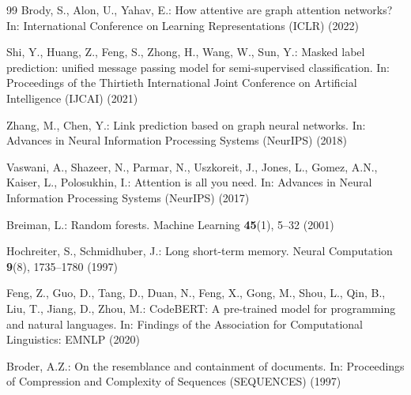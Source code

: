 \documentclass[pdflatex,sn-mathphys-num]{sn-jnl}
\begin{document}
\begin{thebibliography}{99}
Brody, S., Alon, U., Yahav, E.: How attentive are graph attention networks?
In: International Conference on Learning Representations (ICLR) (2022)

Shi, Y., Huang, Z., Feng, S., Zhong, H., Wang, W., Sun, Y.: Masked label
prediction: unified message passing model for semi-supervised classification.
In: Proceedings of the Thirtieth International Joint Conference on Artificial
Intelligence (IJCAI) (2021)

Zhang, M., Chen, Y.: Link prediction based on graph neural networks. In:
Advances in Neural Information Processing Systems (NeurIPS) (2018)

Vaswani, A., Shazeer, N., Parmar, N., Uszkoreit, J., Jones, L., Gomez, A.N.,
Kaiser, L., Polosukhin, I.: Attention is all you need. In: Advances in Neural
Information Processing Systems (NeurIPS) (2017)

Breiman, L.: Random forests. Machine Learning \textbf{45}(1), 5--32 (2001)

Hochreiter, S., Schmidhuber, J.: Long short-term memory. Neural Computation
\textbf{9}(8), 1735--1780 (1997)

Feng, Z., Guo, D., Tang, D., Duan, N., Feng, X., Gong, M., Shou, L., Qin, B.,
Liu, T., Jiang, D., Zhou, M.: CodeBERT: A pre-trained model for programming and
natural languages. In: Findings of the Association for Computational
Linguistics: EMNLP (2020)

Broder, A.Z.: On the resemblance and containment of documents. In: Proceedings
of Compression and Complexity of Sequences (SEQUENCES) (1997)

\end{thebibliography}
\end{document}

